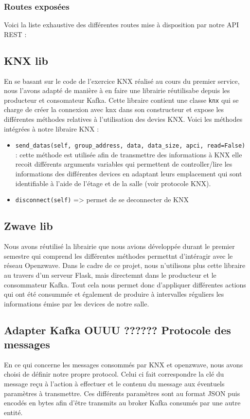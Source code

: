 \subsubsection{Routes exposées}
Voici la liste exhaustive des différentes routes mise à disposition par notre API REST : 


\subsection{KNX lib}
En se basant sur le code de l'exercice KNX réalisé au cours du premier service, nous l'avons adapté de manière à en faire une librairie réutilisabe depuis les producteur et consomateur Kafka.
Cette libraire contient une classe \texttt{knx} qui se charge de créer la connexion avec knx dans son constructeur et expose les différentes méthodes relatives à l'utilisation des devies KNX.
Voici les méthodes intégrées à notre libraire KNX :
\begin{itemize}
    \item \texttt{send_datas(self, group_address, data, data_size, apci, read=False)} : cette méthode est utilisée afin de transmettre des informations à KNX elle recoit différents arguments variables qui permettent de controller/lire les informations des différentes devices en adaptant leurs emplacement qui sont identifiable à l'aide de l'étage et de la salle (voir protocole KNX).
    \item \texttt{disconnect(self)} => permet de se deconnecter de KNX
\end{itemize}

\subsection{Zwave lib}
Nous avons réutilisé la librairie que nous avions développée durant le premier semestre qui comprend les différentes méthodes permettnt d'intéragir avec le réseau Openzwave. 
Dans le cadre de ce projet, nous n'utilisons plus cette libraire au travers d'un serveur Flask, mais directemnt dans le producteur et le consommateur Kafka.
Tout cela nous permet donc d'appliquer différentes actions qui ont été consummée et également de produire à intervalles réguliers les informations émise par les devices de notre salle.

\subsection{Adapter Kafka OUUU ?????? Protocole des messages}
En ce qui concerne les messages consommés par KNX et openzwave, nous avons choisi de définir notre propre protocol.
Celui ci fait correspondre la clé du message reçu à l'action à effectuer et le contenu du message aux éventuels paramètres à transmettre. Ces différents paramètres sont au format JSON puis encodés en bytes afin d'être transmits au broker Kafka consumés par une autre entité.

